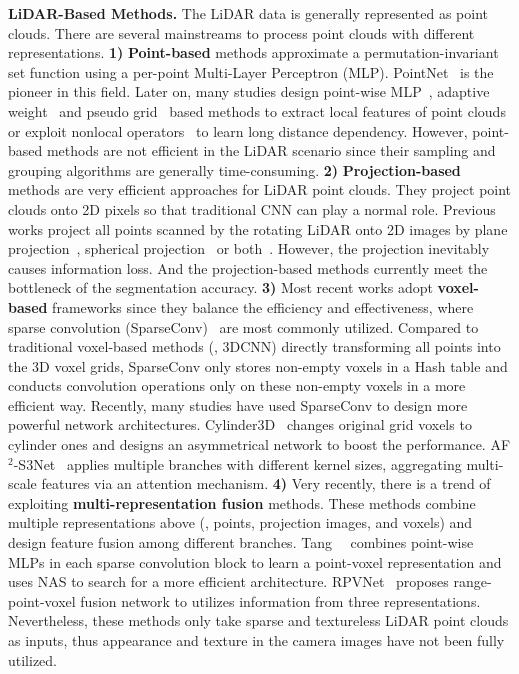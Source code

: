 \documentclass[runningheads]{llncs}
\begin{document}
	\noindent\textbf{LiDAR-Based Methods. }
The LiDAR data is generally represented as point clouds. There are several mainstreams to process point clouds with different representations.
\textbf{1)} \textbf{Point-based} methods approximate a permutation-invariant set function using a per-point Multi-Layer Perceptron (MLP). PointNet~\cite{qi2017pointnet} is the pioneer in this field. 
Later on, many studies design point-wise MLP~\cite{qi2017pointnet++,wang2019dynamic}, adaptive weight~\cite{PointConv,liu2019relation} and pseudo grid~\cite{Thomas_2019_ICCV,hua2018pointwise} based methods to extract local features of point clouds or exploit nonlocal operators~\cite{yan2020pointasnl,zhao2021point,engel2021point} to learn long distance dependency.
However, point-based methods are not efficient in the LiDAR scenario since their sampling and grouping algorithms are generally time-consuming. 
\textbf{2)} \textbf{Projection-based} methods are very efficient approaches for LiDAR point clouds. They project point clouds onto 2D pixels so that traditional CNN can play a normal role. Previous works project all points scanned by the rotating LiDAR onto 2D images by plane projection~\cite{lawin2017deep, boulch2017unstructured, tatarchenko2018tangent}, spherical projection~\cite{wu2018squeezeseg,wu2019squeezesegv2} or both~\cite{liong2020amvnet}.
However, the projection inevitably causes information loss. And the projection-based methods currently meet the bottleneck of the segmentation accuracy.
\textbf{3)} Most recent works adopt \textbf{voxel-based} frameworks since they balance the efficiency and effectiveness, where sparse convolution (SparseConv)~\cite{SparseConv} are most commonly  utilized.
Compared to traditional voxel-based methods (\ie, 3DCNN) directly transforming all points into the 3D voxel grids, SparseConv only stores non-empty voxels in a Hash table and conducts convolution operations only on these non-empty voxels in a more efficient way. 
Recently, many studies have used SparseConv to design more powerful network architectures. 
Cylinder3D~\cite{zhou2020cylinder3d} changes original grid voxels to cylinder ones and designs an asymmetrical network to boost the performance.
AF$^2$-S3Net~\cite{cheng20212} applies multiple branches with different kernel sizes, aggregating multi-scale features via an attention mechanism.
\textbf{4)} Very recently, there is a trend of exploiting \textbf{multi-representation fusion} methods. 
These methods combine multiple representations above (\ie, points, projection images, and voxels) and design feature fusion among different branches.
Tang~\etal~\cite{tang2020searching} combines point-wise MLPs in each sparse convolution block to learn a point-voxel representation and uses NAS to search for a more efficient architecture.
RPVNet~\cite{xu2021rpvnet} proposes range-point-voxel fusion network to utilizes information from three representations.
Nevertheless, these methods only take sparse and textureless LiDAR point clouds as inputs, thus appearance and texture in the camera images have not been fully utilized.
	
\end{document}
